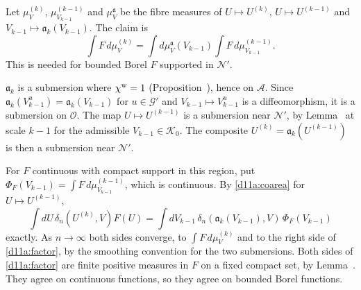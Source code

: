 \begin{detail}\label{d11a:A14c}
Let $\mu^{(k)}_V$, $\mu^{(k-1)}_{V_{k-1}}$ and $\mu^{\mathfrak a}_V$ be the fibre measures of $U\mapsto U^{(k)}$, $U\mapsto U^{(k-1)}$ and $V_{k-1}\mapsto\mathfrak a_k(V_{k-1})$. The claim is
\begin{equation}\label{d11a:factor}
\int F\,d\mu^{(k)}_V=\int d\mu^{\mathfrak a}_V(V_{k-1})\int F\,d\mu^{(k-1)}_{V_{k-1}} .
\end{equation}
This is needed for bounded Borel $F$ supported in $\mathscr N'$.
\begin{step}[Submersions]
$\mathfrak a_k$ is a submersion where $\chi^{\rm w}=1$ (Proposition~), hence on $\mathscr A$. Since $\mathfrak a_k(V_{k-1}^u)=\mathfrak a_k(V_{k-1})$ for $u\in\mathcal G'$ and $V_{k-1}\mapsto V_{k-1}^u$ is a diffeomorphism, it is a submersion on $\mathscr O$. The map $U\mapsto U^{(k-1)}$ is a submersion near $\mathscr N'$, by Lemma~ at scale $k-1$ for the admissible $V_{k-1}\in\mathcal K_0$. The composite $U^{(k)}=\mathfrak a_k(U^{(k-1)})$ is then a submersion near $\mathscr N'$.
\end{step}
\begin{step}
For $F$ continuous with compact support in this region, put $\Phi_F(V_{k-1})=\int F\,d\mu^{(k-1)}_{V_{k-1}}$, which is continuous. By \eqref{d11a:coarea} for $U\mapsto U^{(k-1)}$,
\[
\int dU\,\delta_n(U^{(k)},V)F(U)=\int dV_{k-1}\,\delta_n(\mathfrak a_k(V_{k-1}),V)\,\Phi_F(V_{k-1})
\]
exactly. As $n\to\infty$ both sides converge, to $\int F\,d\mu^{(k)}_V$ and to the right side of \eqref{d11a:factor}, by the smoothing convention for the two submersions. Both sides of \eqref{d11a:factor} are finite positive measures in $F$ on a fixed compact set, by Lemma~. They agree on continuous functions, so they agree on bounded Borel functions.
\end{step}
\end{detail}

